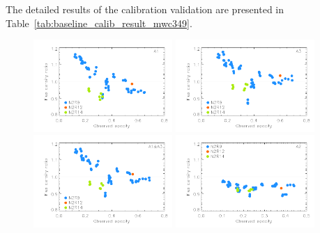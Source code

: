
The detailed results of the calibration validation are
presented in Table~\ref{tab:baseline_calib_result_mwc349}.




\begin{figure}[ht!]
  \begin{center}
    \includegraphics[clip=true,width=0.47\textwidth]{Figures/Calibration/plot_flux_density_ratio_MWC349_obstau_secondary_a1.pdf}
    \includegraphics[clip=true,width=0.47\textwidth]{Figures/Calibration/plot_flux_density_ratio_MWC349_obstau_secondary_a3.pdf}
    \includegraphics[clip=true,width=0.47\textwidth]{Figures/Calibration/plot_flux_density_ratio_MWC349_obstau_secondary_1mm.pdf}
    \includegraphics[clip=true,width=0.47\textwidth]{Figures/Calibration/plot_flux_density_ratio_MWC349_obstau_secondary_a2.pdf}

\end{center}
\end{figure}
